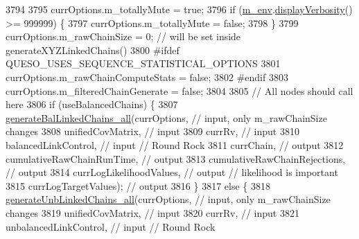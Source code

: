 \begin{DoxyCode}
3794 
3795       currOptions.m\_totallyMute = \textcolor{keyword}{true};
3796       \textcolor{keywordflow}{if} (\hyperlink{class_q_u_e_s_o_1_1_m_l_sampling_a13f1ca4fe9f94822fe572a743eaced1d}{m\_env}.\hyperlink{class_q_u_e_s_o_1_1_base_environment_a1fe5f244fc0316a0ab3e37463f108b96}{displayVerbosity}() >= 999999) \{
3797         currOptions.m\_totallyMute = \textcolor{keyword}{false};
3798       \}
3799       currOptions.m\_rawChainSize          = 0; \textcolor{comment}{// will be set inside generateXYZLinkedChains()}
3800 \textcolor{preprocessor}{#ifdef QUESO\_USES\_SEQUENCE\_STATISTICAL\_OPTIONS}
3801 \textcolor{preprocessor}{}      currOptions.m\_rawChainComputeStats  = \textcolor{keyword}{false};
3802 \textcolor{preprocessor}{#endif}
3803 \textcolor{preprocessor}{}      currOptions.m\_filteredChainGenerate = \textcolor{keyword}{false};
3804 
3805       \textcolor{comment}{// All nodes should call here}
3806       \textcolor{keywordflow}{if} (useBalancedChains) \{
3807         \hyperlink{class_q_u_e_s_o_1_1_m_l_sampling_a8e9d7681d17623c726814d206c8be4b2}{generateBalLinkedChains\_all}(currOptions,                  \textcolor{comment}{// input, only
       m\_rawChainSize changes}
3808                                     unifiedCovMatrix,             \textcolor{comment}{// input}
3809                                     currRv,                       \textcolor{comment}{// input}
3810                                     balancedLinkControl,          \textcolor{comment}{// input // Round Rock}
3811                                     currChain,                    \textcolor{comment}{// output}
3812                                     cumulativeRawChainRunTime,    \textcolor{comment}{// output}
3813                                     cumulativeRawChainRejections, \textcolor{comment}{// output}
3814                                     currLogLikelihoodValues,      \textcolor{comment}{// output // likelihood is important}
3815                                     currLogTargetValues);         \textcolor{comment}{// output}
3816       \}
3817       \textcolor{keywordflow}{else} \{
3818         \hyperlink{class_q_u_e_s_o_1_1_m_l_sampling_a04b0d797b321bb5c4047aab89a445e3c}{generateUnbLinkedChains\_all}(currOptions,                  \textcolor{comment}{// input, only
       m\_rawChainSize changes}
3819                                     unifiedCovMatrix,             \textcolor{comment}{// input}
3820                                     currRv,                       \textcolor{comment}{// input}
3821                                     unbalancedLinkControl,        \textcolor{comment}{// input // Round Rock}

\end{DoxyCode}

